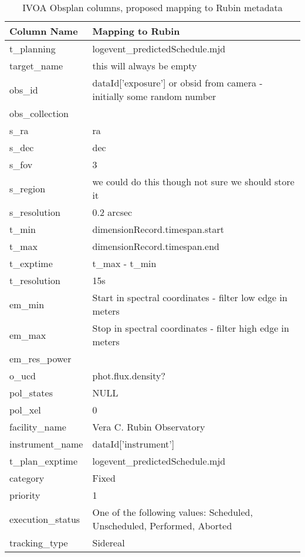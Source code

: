 
\begin{table}
\begin{tabular}{ |p{}|p{}| }
\hline
\textbf{Column Name} & \textbf{Mapping to Rubin} \\
\hline
t\_planning & logevent\_predictedSchedule.mjd \\
\hline
target\_name & this will always be empty \\
\hline
obs\_id & dataId['exposure'] or obsid from camera - initially some random number\\
\hline
obs\_collection &  \\
\hline
s\_ra & ra \\
\hline
s\_dec & dec \\
\hline
s\_fov  & 3 \\
\hline
s\_region & we could do this though not sure we should store it \\
\hline
s\_resolution & 0.2 arcsec \\
\hline
t\_min & dimensionRecord.timespan.start \\
\hline
t\_max & dimensionRecord.timespan.end \\
\hline
t\_exptime & t\_max - t\_min \\
\hline
t\_resolution & 15s \\
\hline
em\_min & Start in spectral coordinates - filter low edge in meters   \\
\hline
em\_max & Stop in spectral coordinates - filter high edge in meters \\
\hline
em\_res\_power & \\
\hline
o\_ucd &  phot.flux.density? \\
\hline
pol\_states & NULL \\
\hline
pol\_xel & 0\\
\hline
facility\_name & Vera C. Rubin Observatory\\
\hline
instrument\_name &  dataId['instrument'] \\
\hline
t\_plan\_exptime & logevent\_predictedSchedule.mjd \\
\hline
category & Fixed \\
\hline
priority & 1 \\
\hline
execution\_status & One of the following values:  Scheduled, Unscheduled, Performed, Aborted \\
\hline
tracking\_type &  Sidereal \\
\hline
\end{tabular}
\caption{IVOA Obsplan columns, proposed  mapping to Rubin metadata}
\label{tab:schema}
\end{table}
